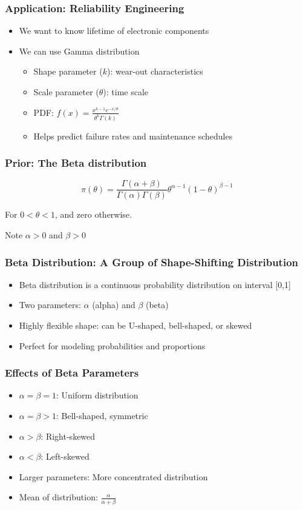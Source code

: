 \documentclass[12pt]{beamer}
\begin{document}
\begin{frame}
	\frametitle{Application: Reliability Engineering}
	\begin{itemize}[label={\color{blue}$\blacktriangleright$}]
		\item We want to know lifetime of electronic components
		\item We can use Gamma distribution
		\begin{itemize}[label={\color{blue}$\blacktriangleright$}]
			\item Shape parameter ($k$): wear-out characteristics
			\item Scale parameter ($\theta$): time scale
			\item PDF: $f(x) = \frac{x^{k-1}e^{-x/\theta}}{\theta^k\Gamma(k)}$
			\item Helps predict failure rates and maintenance schedules
		\end{itemize}
	\end{itemize}
\end{frame}
\begin{frame}
	\frametitle{Prior: The Beta distribution}
	
	\[
	\pi(\theta) = \frac{\Gamma(\alpha + \beta)}{\Gamma(\alpha)\Gamma(\beta)}\theta^{\alpha-1}(1-\theta)^{\beta-1}
	\]
	
	
	For $0 < \theta < 1$, and zero otherwise.
	
	
	Note $\alpha > 0$ and $\beta > 0$
	
\end{frame}
\begin{frame}
	\frametitle{Beta Distribution: A Group of Shape-Shifting Distribution}
	\begin{itemize}[label={\color{blue}$\blacktriangleright$}]
		\item Beta distribution is a continuous probability distribution on interval [0,1]
		\item Two parameters: $\alpha$ (alpha) and $\beta$ (beta)
		\item Highly flexible shape: can be U-shaped, bell-shaped, or skewed
		\item Perfect for modeling probabilities and proportions
	\end{itemize}
\end{frame}

\begin{frame}
	\frametitle{Effects of Beta Parameters}
	\begin{itemize}[label={\color{blue}$\blacktriangleright$}]
		\item $\alpha = \beta = 1$: Uniform distribution
		\item $\alpha = \beta > 1$: Bell-shaped, symmetric
		\item $\alpha > \beta$: Right-skewed
		\item $\alpha < \beta$: Left-skewed
		\item Larger parameters: More concentrated distribution
		\item Mean of distribution: $\frac{\alpha}{\alpha + \beta}$
	\end{itemize}
\end{frame}
\end{document}
